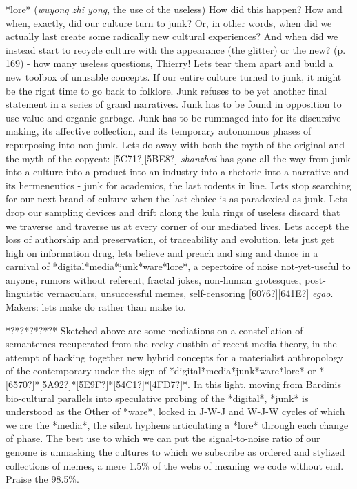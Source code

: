 *lore*\newline
{} (\textit{wuyong zhi yong}, the
use of the useless)\newline
{\textquotedbl}How did this happen? How and when, exactly, did our
culture turn to junk? Or, in other words, when did we actually last
create some radically new cultural experiences? And when did we instead
start to recycle culture with the appearance (the glitter) or the
new?{\textquotedbl} (p. 169) - how many useless questions, Thierry!
Let{\textquotesingle}s tear them apart and build a new toolbox of
unusable concepts. If our entire culture turned to junk, it might be
the right time to go back to folklore. Junk refuses to be yet another
final statement in a series of grand narratives. Junk has to be found
in opposition to use value and organic garbage. Junk has to be rummaged
into for its discursive making, its affective collection, and its
temporary autonomous phases of repurposing into non-junk.
Let{\textquotesingle}s do away with both the myth of the original and
the myth of the copycat: [5C71?][5BE8?] \textit{shanzhai}
has gone all the way from junk into a culture into a product into an
industry into a rhetoric into a narrative and its hermeneutics - junk
for academics, the last rodents in line. Let{\textquotesingle}s stop
searching for our next brand of culture when the last choice is as
paradoxical as junk. Let{\textquotesingle}s drop our sampling devices
and drift along the kula rings of useless discard that we traverse and
traverse us at every corner of our mediated lives.
Let{\textquotesingle}s accept the loss of authorship and preservation,
of traceability and evolution, let{\textquotesingle}s just get high on
information drug, let{\textquotesingle}s believe and preach and sing
and dance in a carnival of *digital*media*junk*ware*lore*, a repertoire
of noise not-yet-useful to anyone, rumors without referent, fractal
jokes, non-human grotesques, post-linguistic vernaculars, unsuccessful
memes, self-censoring [6076?][641E?] \textit{egao}. Makers:
let{\textquotesingle}s {\textquotedbl}make do{\textquotedbl} rather
than {\textquotedbl}make to{\textquotedbl}.

*?*?*?*?*?*\newline
Sketched above are some mediations on a constellation of semantemes
recuperated from the reeky dustbin of recent media theory, in the
attempt of hacking together new hybrid concepts for a materialist
anthropology of the contemporary under the sign of
*digital*media*junk*ware*lore* or
*[6570?]*[5A92?]*[5E9F?]*[54C1?]*[4FD7?]*. In this light, moving from
Bardini{\textquotesingle}s bio-cultural parallels into speculative
probing of the *digital*, *junk* is understood as the Other of *ware*,
locked in J-W-J and W-J-W cycles of which we are the *media*, the
silent hyphens articulating a *lore* through each change of phase. The
best use to which we can put the signal-to-noise ratio of our genome is
unmasking the cultures to which we subscribe as ordered and stylized
collections of memes, a mere 1.5\% of the webs of meaning we code
without end. Praise the 98.5\%.
